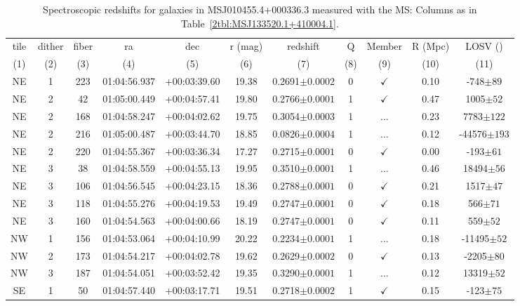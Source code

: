 \begin{landscape}
	\begin{table}
		\centering 
		\caption[Spectroscopic redshifts for galaxies in MSJ010455.4+000336.3]{Spectroscopic redshifts for galaxies in MSJ010455.4+000336.3 measured with the MS: Columns as in Table~\ref{2tbl:MSJ133520.1+410004.1}.}
		\begin{tabular}{ccccccccccc}
			\hline
			tile & dither & fiber & ra & dec & r (mag) & redshift & Q & Member & R (Mpc) & LOSV (\kms) \\
			(1) & (2) & (3) & (4) & (5) & (6) & (7) & (8) & (9) & (10) & (11) \\
			\hline \hline
			NE & 1 & 223 & 01:04:56.937 & +00:03:39.60 & 19.38 & 0.2691$\pm{0.0002}$ & 0 & $\checkmark$ & 0.10 & -748$\pm{89}$ \\
			NE & 2 & 42 & 01:05:00.449 & +00:04:57.41 & 19.80 & 0.2766$\pm{0.0001}$ & 1 & $\checkmark$ & 0.47 & 1005$\pm{52}$ \\
			NE & 2 & 168 & 01:04:58.247 & +00:04:02.62 & 19.75 & 0.3054$\pm{0.0003}$ & 1 & ... & 0.23 & 7783$\pm{122}$ \\
			NE & 2 & 216 & 01:05:00.487 & +00:03:44.70 & 18.85 & 0.0826$\pm{0.0004}$ & 1 & ... & 0.12 & -44576$\pm{193}$ \\
			NE & 2 & 220 & 01:04:55.367 & +00:03:36.34 & 17.27 & 0.2715$\pm{0.0001}$ & 0 & $\checkmark$ & 0.00 & -193$\pm{61}$ \\
			NE & 3 & 38 & 01:04:58.559 & +00:04:55.13 & 19.95 & 0.3510$\pm{0.0001}$ & 1 & ... & 0.46 & 18494$\pm{56}$ \\
			NE & 3 & 106 & 01:04:56.545 & +00:04:23.15 & 18.36 & 0.2788$\pm{0.0001}$ & 0 & $\checkmark$ & 0.21 & 1517$\pm{47}$ \\
			NE & 3 & 118 & 01:04:55.276 & +00:04:19.53 & 19.49 & 0.2747$\pm{0.0001}$ & 0 & $\checkmark$ & 0.18 & 566$\pm{71}$ \\
			NE & 3 & 160 & 01:04:54.563 & +00:04:00.66 & 18.19 & 0.2747$\pm{0.0001}$ & 0 & $\checkmark$ & 0.11 & 559$\pm{52}$ \\
			NW & 1 & 156 & 01:04:53.064 & +00:04:10.99 & 20.22 & 0.2234$\pm{0.0001}$ & 1 & ... & 0.18 & -11495$\pm{52}$ \\
			NW & 2 & 173 & 01:04:54.217 & +00:04:02.78 & 19.62 & 0.2629$\pm{0.0002}$ & 0 & $\checkmark$ & 0.13 & -2205$\pm{80}$ \\
			NW & 3 & 187 & 01:04:54.051 & +00:03:52.42 & 19.35 & 0.3290$\pm{0.0001}$ & 1 & ... & 0.12 & 13319$\pm{52}$ \\
			SE & 1 & 50 & 01:04:57.440 & +00:03:17.71 & 19.51 & 0.2718$\pm{0.0002}$ & 1 & $\checkmark$ & 0.15 & -123$\pm{75}$ \\

\end{tabular}
\end{table}
\end{landscape}
